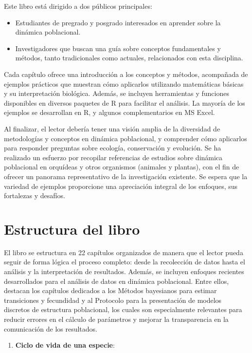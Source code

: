 \documentclass[
  12pt,
  letterpaper,
]{book}
\providecommand{\tightlist}{%
  \setlength{\itemsep}{0pt}\setlength{\parskip}{0pt}}\usepackage{longtable,booktabs,array}
\begin{document}
Este libro está dirigido a dos públicos principales:

\begin{itemize}
\tightlist
\item
  Estudiantes de pregrado y posgrado interesados en aprender sobre la
  dinámica poblacional.
\item
  Investigadores que buscan una guía sobre conceptos fundamentales y
  métodos, tanto tradicionales como actuales, relacionados con esta
  disciplina.
\end{itemize}

Cada capítulo ofrece una introducción a los conceptos y métodos,
acompañada de ejemplos prácticos que muestran cómo aplicarlos utilizando
matemáticas básicas y su interpretación biológica. Además, se incluyen
herramientas y funciones disponibles en diversos paquetes de R para
facilitar el análisis. La mayoría de los ejemplos se desarrollan en R, y
algunos complementarios en MS Excel.

Al finalizar, el lector debería tener una visión amplia de la diversidad
de metodologías y conceptos en dinámica poblacional, y comprender cómo
aplicarlos para responder preguntas sobre ecología, conservación y
evolución. Se ha realizado un esfuerzo por recopilar referencias de
estudios sobre dinámica poblacional en orquídeas y otros organismos
(animales y plantas), con el fin de ofrecer un panorama representativo
de la investigación existente. Se espera que la variedad de ejemplos
proporcione una apreciación integral de los enfoques, sus fortalezas y
desafíos.

\section{Estructura del libro}\label{estructura-del-libro}

El libro se estructura en 22 capítulos organizados de manera que el
lector pueda seguir de forma lógica el proceso completo: desde la
recolección de datos hasta el análisis y la interpretación de
resultados. Además, se incluyen enfoques recientes desarrollados para el
análisis de datos en dinámica poblacional. Entre ellos, destacan los
capítulos dedicados a los Métodos bayesianos para estimar transiciones y
fecundidad y al Protocolo para la presentación de modelos discretos de
estructura poblacional, los cuales son especialmente relevantes para
reducir errores en el cálculo de parámetros y mejorar la transparencia
en la comunicación de los resultados.

\begin{enumerate}
\def\labelenumi{\arabic{enumi}.}
\tightlist
\item
  \textbf{Ciclo de vida de una especie}:
\end{enumerate}
\end{document}

